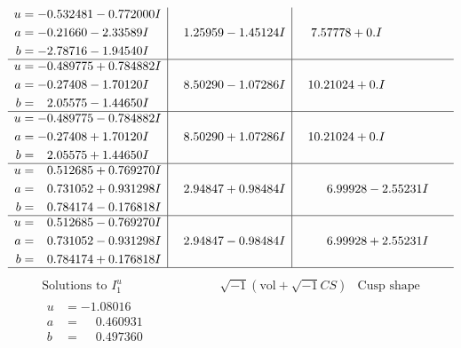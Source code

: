 \documentclass[1p]{elsarticle_modified}
\theoremstyle{definition}
\newcommand{\I}{\sqrt{-1}}
\begin{document}
$$\begin{array}{c|c|c}
\begin{aligned}
u &= -0.532481 - 0.772000 I \\
a &= -0.21660 - 2.33589 I \\
b &= -2.78716 - 1.94540 I\end{aligned}
 & \phantom{-}1.25959 - 1.45124 I & \phantom{-}7.57778 + 0. I\phantom{ +0.000000I} \\ \hline\begin{aligned}
u &= -0.489775 + 0.784882 I \\
a &= -0.27408 - 1.70120 I \\
b &= \phantom{-}2.05575 - 1.44650 I\end{aligned}
 & \phantom{-}8.50290 - 1.07286 I & \phantom{-}10.21024 + 0. I\phantom{ +0.000000I} \\ \hline\begin{aligned}
u &= -0.489775 - 0.784882 I \\
a &= -0.27408 + 1.70120 I \\
b &= \phantom{-}2.05575 + 1.44650 I\end{aligned}
 & \phantom{-}8.50290 + 1.07286 I & \phantom{-}10.21024 + 0. I\phantom{ +0.000000I} \\ \hline\begin{aligned}
u &= \phantom{-}0.512685 + 0.769270 I \\
a &= \phantom{-}0.731052 + 0.931298 I \\
b &= \phantom{-}0.784174 - 0.176818 I\end{aligned}
 & \phantom{-}2.94847 + 0.98484 I & \phantom{-}6.99928 - 2.55231 I \\ \hline\begin{aligned}
u &= \phantom{-}0.512685 - 0.769270 I \\
a &= \phantom{-}0.731052 - 0.931298 I \\
b &= \phantom{-}0.784174 + 0.176818 I\end{aligned}
 & \phantom{-}2.94847 - 0.98484 I & \phantom{-}6.99928 + 2.55231 I\\
 \hline 
 \end{array}$$\newpage$$\begin{array}{c|c|c}  
\text{Solutions to }I^u_{1}& \I (\text{vol} + \sqrt{-1}CS) & \text{Cusp shape}\\
 \hline 
\begin{aligned}
u &= -1.08016\phantom{ +0.000000I} \\
a &= \phantom{-}0.460931\phantom{ +0.000000I} \\
b &= \phantom{-}0.497360\phantom{ +0.000000I}\end{aligned}

\end{array}$$
\end{document}
